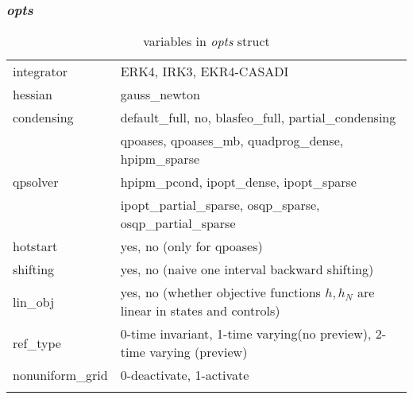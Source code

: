 \documentclass{article}
\newcommand{\alert}[1]{{\textit{#1}}}
\begin{document}
\subsubsection{\alert{opts}}
\begin{longtable}{l|l}
	\hline
		integrator       & ERK4, IRK3, EKR4-CASADI                                                                                                                                      \\
		hessian          & gauss\_newton                                                                                                                                                \\
		condensing       & default\_full, no, blasfeo\_full, partial\_condensing                                                                                                        \\ \hline
		\multirow{3}{*}{qpsolver} & qpoases, qpoases\_mb, quadprog\_dense, hpipm\_sparse        \\
		& hpipm\_pcond, ipopt\_dense, ipopt\_sparse                   \\
		& ipopt\_partial\_sparse, osqp\_sparse, osqp\_partial\_sparse \\ \hline
		hotstart         & yes, no (only for qpoases)                                                                                                                                                     \\
		shifting         & yes, no (naive one interval backward shifting)                                                                                                                                                      \\
		lin\_obj         & yes, no (whether objective functions $h,h_N$ are linear in states and controls)                                                                                                                                                     \\
		ref\_type        & 0-time invariant, 1-time varying(no preview), 2-time varying (preview)                                                                                                                                                     \\
		nonuniform\_grid & 0-deactivate, 1-activate\\ \hline        		
	\caption{variables in \alert{opts} struct}
	\label{table:opts}                                                        
\end{longtable}
\end{document}
